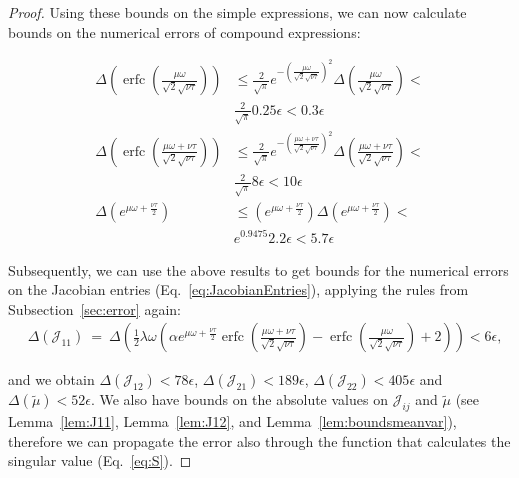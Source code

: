 \documentclass{article}
\newcommand\munn{{\tilde \mu}}
\renewcommand{\leq}{\leqslant}
\DeclareMathOperator{\erfc}{erfc}
\begin{document}
\begin{proof}
Using these bounds on the simple expressions, we can now calculate bounds on the numerical errors of compound expressions:

\begin{align}
 \Delta \left(\erfc \left(\frac{\mu \omega }{\sqrt{2}\sqrt{\nu \tau}}\right) \right) &\leq 
       \frac{2}{\sqrt{\pi}}  e^{ - \left(\frac{\mu \omega }{\sqrt{2}\sqrt{\nu \tau}}\right)^2 } \Delta  \left(\frac{\mu \omega }{\sqrt{2}\sqrt{\nu \tau}}  \right) < \\ \nonumber
       &\frac{2}{\sqrt{\pi}}  0.25 \epsilon < 0.3 \epsilon \\
  \Delta \left(\erfc \left(\frac{\mu \omega + \nu \tau}{\sqrt{2}\sqrt{\nu \tau}}\right) \right) &\leq 
       \frac{2}{\sqrt{\pi}}  e^{ - \left(\frac{\mu \omega + \nu \tau}{\sqrt{2}\sqrt{\nu \tau}}\right)^2 } \Delta  \left(\frac{\mu \omega + \nu \tau}{\sqrt{2}\sqrt{\nu \tau}}  \right) < \\ \nonumber
       &\frac{2}{\sqrt{\pi}}  8 \epsilon < 10 \epsilon \\
  \Delta \left(e^{\mu \omega + \frac{\nu \tau}{2} } \right) &\leq \left(e^{\mu \omega + \frac{\nu \tau}{2} } \right) \Delta \left(e^{\mu \omega + \frac{\nu \tau}{2} } \right) < \\   
       & e^{0.9475}  2.2 \epsilon < 5.7 \epsilon
\end{align}

Subsequently, we can use the above results to get bounds for the numerical errors on the Jacobian entries (Eq.~\eqref{eq:JacobianEntries}), 
applying the rules from Subsection~\ref{sec:error} again:
\begin{align}
& \Delta \left( {\mathcal J}_{11} \right) \  = \ \Delta \left( \frac{1}{2} \lambda  \omega \left(\alpha  e^{\mu \omega+\frac{\nu \tau}{2}} \erfc \left(\frac{\mu \omega+\nu \tau}{\sqrt{2} \sqrt{\nu \tau}}\right)
- \erfc \left(\frac{\mu \omega}{\sqrt{2} \sqrt{\nu \tau}}\right)+2\right) \right) < 6 \epsilon, 
\end{align}

and we obtain $\Delta \left( {\mathcal J}_{12} \right) < 78\epsilon$,  $\Delta \left( {\mathcal J}_{21} \right) < 189\epsilon$, $\Delta \left( {\mathcal J}_{22} \right) < 405\epsilon$
and $\Delta \left(\munn\right) < 52\epsilon$. 
We also have bounds on the absolute values on $\mathcal J_{ij}$ and $\munn$ (see Lemma~\ref{lem:J11},
Lemma~\ref{lem:J12}, and Lemma~\ref{lem:boundsmeanvar}), therefore we can 
propagate the error also through the function that calculates the singular value (Eq.~\eqref{eq:S}). 


\end{proof}
\end{document}
